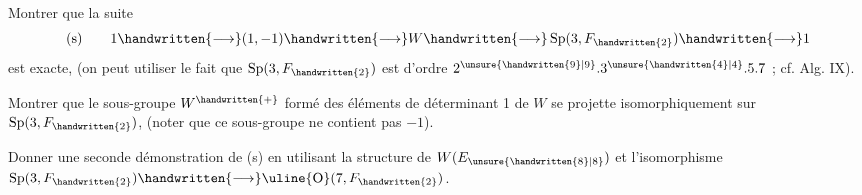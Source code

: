 Montrer que la suite
\[
\text{(s)}\qquad 1\handwritten{\longrightarrow}(1,-1)\handwritten{\longrightarrow}W\handwritten{\longrightarrow}\operatorname{Sp}(3,F_{\handwritten{2}})\handwritten{\longrightarrow}1
\]
est exacte, (on peut utiliser le fait que $\operatorname{Sp}(3,F_{\handwritten{2}})$ est d'ordre $2^{\unsure{\handwritten{9}|9}}.3^{\unsure{\handwritten{4}|4}}.5.7$ ; cf. Alg. IX).

Montrer que le sous-groupe $W^{\handwritten{+}}$ formé des éléments de déterminant 1 de $W$ se projette isomorphiquement sur $\operatorname{Sp}(3,F_{\handwritten{2}})$, (noter que ce sous-groupe ne contient pas $-1$).

Donner une seconde démonstration de (s) en utilisant la structure de $W(E_{\unsure{\handwritten{8}|8}})$ et l'isomorphisme $\operatorname{Sp}(3,F_{\handwritten{2}})\handwritten{\longrightarrow}\uline{\operatorname{O}}(7,F_{\handwritten{2}})$.
